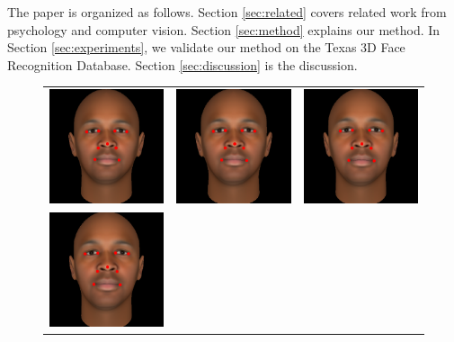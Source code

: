 \documentclass[runningheads]{llncs}
\begin{document}
The paper is organized as follows.
Section \ref{sec:related} covers related work from psychology and computer vision.
Section \ref{sec:method} explains our method.
In Section \ref{sec:experiments}, we validate our method on the Texas 3D Face Recognition Database.
Section \ref{sec:discussion} is the discussion.

\begin{figure}[ht!]
\centering
\begin{tabular}{ccc}
\includegraphics[width=.33\linewidth]{resources/figures/extracted_fiducial_0006.png} &
\includegraphics[width=.33\linewidth]{resources/figures/extracted_fiducial_0008.png} &
\includegraphics[width=.33\linewidth]{resources/figures/extracted_fiducial_0001.png} \\
\includegraphics[width=.33\linewidth]{resources/figures/extracted_fiducial_0002.png} &

\end{tabular}
\end{figure}
\end{document}
